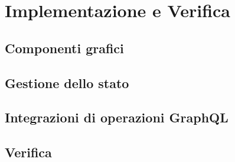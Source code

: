 \chapter{Implementazione e Verifica}

\section{Componenti grafici}

\section{Gestione dello stato}


\section{Integrazioni di operazioni GraphQL}

\section{Verifica}